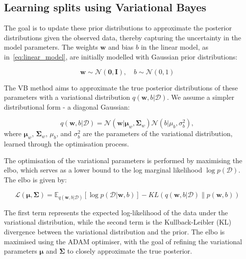 \documentclass[3p,review,authoryear]{elsarticle}
\begin{document}
\subsection{Learning splits using Variational Bayes}


The goal is to update these prior distributions to approximate the posterior distributions given the observed data, thereby capturing the uncertainty in the model parameters.
The weights \(\mathbf{w}\) and bias \(b\) in the linear model, as in~\eqref{eq:linear_model}, are initially modelled with Gaussian prior distributions:

\begin{equation}
\mathbf{w} \sim \mathcal{N}(\mathbf{0}, \mathbf{I}), \quad b \sim \mathcal{N}(0, 1)
\end{equation}

The VB method aims to approximate the true posterior distributions of these parameters with a variational distribution \(q(\mathbf{w}, b|\mathcal{D})\).
We assume a simpler distributional form - a diagonal Gaussian:

\begin{equation}
q(\mathbf{w}, b|\mathcal{D}) = \mathcal{N}(\mathbf{w}|\boldsymbol{\mu}_w, \boldsymbol{\Sigma}_w) \mathcal{N}(b|\mu_b, \sigma_b^2),
\end{equation}
where \(\boldsymbol{\mu}_w\), \(\boldsymbol{\Sigma}_w\), \(\mu_b\), and \(\sigma_b^2\) are the parameters of the variational distribution, learned through the optimisation process.

The optimisation of the variational parameters is performed by maximising the \gls{elbo}, which serves as a lower bound to the log marginal likelihood \(\log p(\mathcal{D})\).
The \gls{elbo} is given by:

\begin{equation}
\mathcal{L}(\boldsymbol{\mu}, \boldsymbol{\Sigma}) = \mathbb{E}_{q(\mathbf{w}, b|\mathcal{D})}\left[\log p(\mathcal{D}|\mathbf{w}, b)\right] - KL\left(q(\mathbf{w}, b|\mathcal{D}) \parallel p(\mathbf{w}, b)\right)
\label{eq:elbo}
\end{equation}

The first term represents the expected log-likelihood of the data under the variational distribution, while the second term is the Kullback-Leibler (KL) divergence between the variational distribution and the prior. The \gls{elbo} is maximised using the ADAM optimiser, with the goal of refining the variational parameters \(\boldsymbol{\mu}\) and \(\boldsymbol{\Sigma}\) to closely approximate the true posterior.
\end{document}
